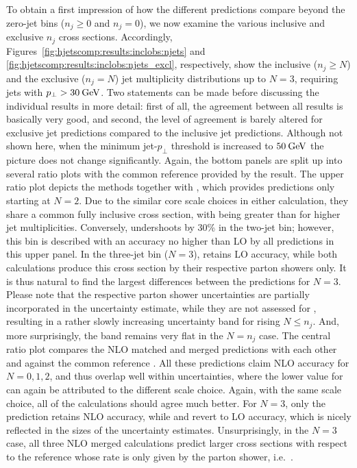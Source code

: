 To obtain a first impression of how the different predictions 
compare beyond the zero-jet bins ($n_j\ge0$ and $n_j=0$), we now
examine the various inclusive and exclusive $n_j$ cross sections.
Accordingly, Figures~\ref{fig:hjetscomp:results:inclobs:njets} and
\ref{fig:hjetscomp:results:inclobs:njets_excl}, respectively, show the
inclusive ($n_j\ge N$) and the exclusive ($n_j=N$) jet multiplicity
distributions up to $N=3$, requiring \antikt jets
with $p_\perp>30\text{\:GeV}$. Two statements can be made before discussing
the individual results in more detail:
first of all, the agreement between all results is basically very good, and
second, the level of agreement is barely altered for exclusive jet
predictions compared to the inclusive jet predictions. 
Although not
shown here, when  the minimum jet-$p_\perp$ threshold is increased to
$50\text{\:GeV}$ the picture does not change significantly.
Again, the bottom panels are split up into several ratio plots with
the common reference provided by the \Powheg \NNLOPS result. The
upper ratio plot depicts the \NNLOPS methods together
with \Hej, which provides predictions only starting at $N=2$. Due to the similar core scale
choices in either \NNLOPS calculation, they share a common fully
inclusive cross section, with \Sherpa being greater than \Powheg for higher
jet multiplicities. Conversely, \Hej undershoots by 30\% in the
two-jet bin; however, this bin is described with an accuracy no higher
than LO by all predictions in this upper panel. In the three-jet bin
($N=3$), \Hej retains  LO accuracy, while both \NNLOPS calculations
produce this cross section by their respective parton showers
only. It is thus natural to find the largest differences between the
\NNLOPS predictions for $N=3$. Please note that the respective parton
shower uncertainties are partially incorporated in the \Sherpa \NNLOPS
uncertainty estimate, while they are not assessed for \Powheg,
resulting in a rather slowly increasing uncertainty band for rising
$N\le n_j$. And, more surprisingly, the \Powheg band remains very flat
in the $N=n_j$ case. The central ratio plot
compares the NLO matched and merged predictions with each other and
against the common reference \Powheg \NNLOPS. All these predictions
claim NLO accuracy for $N=0,1,2$, and thus overlap well within
uncertainties, where the lower value for \MGaMC can again be attributed
to the different scale choice. Again, with the same scale choice, all of
the calculations should agree much better. For $N=3$, only the \Sherpa \MEPSatNLO
prediction retains NLO accuracy, while \MGaMC and \Herwig revert to LO
accuracy, which is nicely reflected in the sizes of the uncertainty estimates. 
Unsurprisingly, in the $N=3$ case, all three NLO merged calculations
predict larger cross sections with respect to the reference whose rate
is only given by the parton shower, i.e.~\Pythia.

